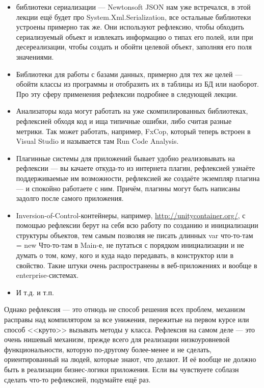 \documentclass[a5paper]{article}
\begin{document}
\begin{itemize}
    \item библиотеки сериализации --- Newtonsoft JSON нам уже встречался, в этой лекции ещё будет про System.Xml.Serialization, все остальные библиотеки устроены примерно так же. Они используют рефлексию, чтобы обходить сериализуемый объект и извлекать информацию о типах его полей, или при десереализации, чтобы создать и обойти целевой объект, заполняя его поля значениями.
    \item Библиотеки для работы с базами данных, примерно для тех же целей --- обойти классы из программы и отобразить их в таблицы из БД или наоборот. Про эту сферу применения рефлексии подробнее в следующей лекции.
    \item Анализаторы кода могут работать на уже скомпилированных библиотеках, рефлексией обходя код и ища типичные ошибки, либо считая разные метрики. Так может работать, например, FxCop, который теперь встроен в Visual Studio и называется там Run Code Analysis.
    \item Плагинные системы для приложений бывает удобно реализовывать на рефлексии --- вы качаете откуда-то из интернета плагин, рефлексией узнаёте поддерживаемые им возможности, рефлексией же создаёте экземпляр плагина --- и спокойно работаете с ним. Причём, плагины могут быть написаны задолго после самого приложения.
    \item Inversion-of-Control-контейнеры, например, \url{http://unitycontainer.org/}, с помощью рефлексии берут на себя всю работу по созданию и инициализации структуры объектов, тем самым позволяя не писать длинных var что-то-там = new Что-то-там в Main-е, не путаться с порядком инициализации и не думать о том, кому, кого и куда надо передавать, в конструктор или в свойство. Такие штуки очень распространены в веб-приложениях и вообще в enterprise-системах.
    \item И т.д. и т.п.
\end{itemize}

Однако рефлексия --- это отнюдь не способ решения всех проблем, механизм расправы над компилятором за все унижения, пережитые на первом курсе или способ <<круто>> вызывать методы у класса. Рефлексия на самом деле --- это очень нишевый механизм, прежде всего для реализации низкоуровневой функциональности, которую по-другому более-менее и не сделать, ориентированный на людей, которые знают, что делают. И её вообще не должно быть в реализации бизнес-логики приложения. Если вы чувствуете соблазн сделать что-то рефлексией, подумайте ещё раз.
\end{document}
